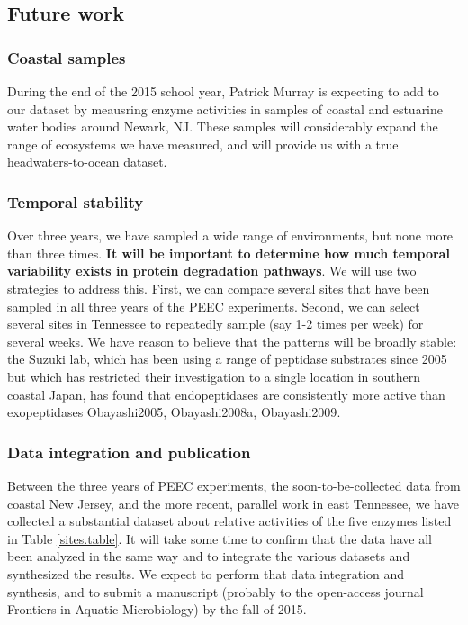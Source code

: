 \documentclass{article}
\begin{document}
    \subsection{Future work}
    
    \subsubsection{Coastal samples}
    During the end of the 2015 school year, Patrick Murray is expecting to add to our dataset by meausring enzyme activities in samples of coastal and estuarine water bodies around Newark, NJ. These samples will considerably expand the range of ecosystems we have measured, and will provide us with a true headwaters-to-ocean dataset.
    
    
    \subsubsection{Temporal stability}
    Over three years, we have sampled a wide range of environments, but none more than three times. \textbf{It will be important to determine how much temporal variability exists in protein degradation pathways}. We will use two strategies to address this. First, we can compare several sites that have been sampled in all three years of the PEEC experiments. Second, we can select several sites in Tennessee to repeatedly sample (say 1-2 times per week) for several weeks. We have reason to believe that the patterns will be broadly stable: the Suzuki lab, which has been using a range of peptidase substrates since 2005 but which has restricted their investigation to a single location in southern coastal Japan, has found that endopeptidases are consistently more active than exopeptidases {Obayashi2005, Obayashi2008a, Obayashi2009}. 
    
    \subsubsection{Data integration and publication}
    Between the three years of PEEC experiments, the soon-to-be-collected data from coastal New Jersey, and the more recent, parallel work in east Tennessee, we have collected a substantial dataset about relative activities of the five enzymes listed in Table \ref{sites.table}. It will take some time to confirm that the data have all been analyzed in the same way and to integrate the various datasets and synthesized the results. We expect to perform that data integration and synthesis, and to submit a manuscript (probably to the open-access journal Frontiers in Aquatic Microbiology) by the fall of 2015.
    
\end{document}
